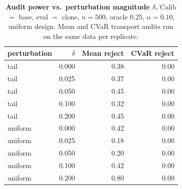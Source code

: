 \begin{table}[h]
\centering\small
\caption{\textbf{Audit power vs.\ perturbation magnitude $\delta$.} Calib $=$ base, eval $=$ clone, $n{=}500$, oracle 0.25, $\alpha{=}0.10$, uniform design. Mean and CVaR transport audits run on the same data per replicate.}
\label{tab:mc-validation-power}
\begin{tabular}{lrrr}
\toprule
perturbation & $\delta$ & Mean reject & CVaR reject \\
\midrule
tail & 0.000 & 0.38 & 0.00 \\
tail & 0.025 & 0.37 & 0.00 \\
tail & 0.050 & 0.45 & 0.00 \\
tail & 0.100 & 0.32 & 0.00 \\
tail & 0.200 & 0.45 & 0.00 \\
uniform & 0.000 & 0.42 & 0.00 \\
uniform & 0.025 & 0.18 & 0.00 \\
uniform & 0.050 & 0.20 & 0.00 \\
uniform & 0.100 & 0.42 & 0.00 \\
uniform & 0.200 & 0.80 & 0.00 \\
\bottomrule
\end{tabular}
\end{table}

